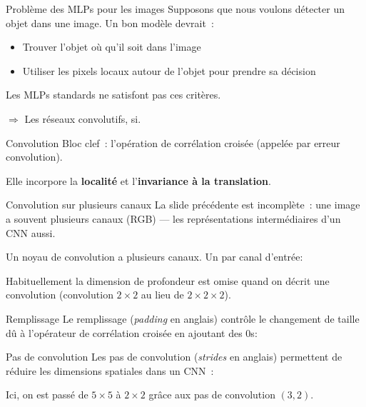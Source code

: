 \begin{frame}{Problème des MLPs pour les images}
  Supposons que nous voulons détecter un objet dans une image. Un bon modèle devrait~:
  \begin{itemize}
    \item Trouver l'objet où qu'il soit dans l'image
    \item Utiliser les pixels locaux autour de l'objet pour prendre sa décision
  \end{itemize}

  Les MLPs standards ne satisfont pas ces critères.

  $\Rightarrow$ Les réseaux convolutifs, si.
\end{frame}

\begin{frame}{Convolution}
  Bloc clef~: l'opération de corrélation croisée (appelée par erreur convolution).

  Elle incorpore la \textbf{localité} et l'\textbf{invariance à la translation}.

\end{frame}

\begin{frame}{Convolution sur plusieurs canaux}
  La slide précédente est incomplète~: une image a souvent plusieurs canaux (RGB) --- les représentations intermédiaires d'un CNN aussi.

  Un noyau de convolution a plusieurs canaux. Un par canal d'entrée:


  Habituellement la dimension de profondeur est omise quand on décrit une convolution (convolution $2 \times 2$ au lieu de $2 \times 2 \times 2$).
\end{frame}

\begin{frame}{Remplissage}
  Le remplissage (\textit{padding} en anglais) contrôle le changement de taille dû à l'opérateur de corrélation croisée en ajoutant des $0$s:

\end{frame}

\begin{frame}{Pas de convolution}
  Les pas de convolution (\textit{strides} en anglais) permettent de réduire les dimensions spatiales dans un CNN~:


  Ici, on est passé de $5 \times 5$ à $2 \times 2$ grâce aux pas de convolution $(3, 2)$.
\end{frame}

